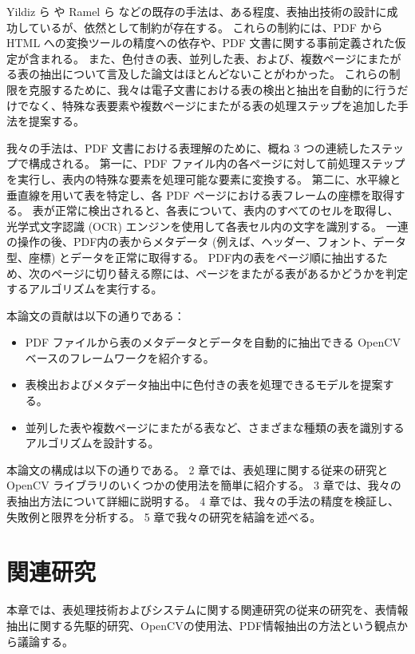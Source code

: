 \documentclass[uplatex, twocolumn,10pt]{jsarticle}
\begin{document}
Yildiz ら \cite{bib01} や Ramel ら \cite{bib02} などの既存の手法は、ある程度、表抽出技術の設計に成功しているが、依然として制約が存在する。
これらの制約には、PDF から HTML への変換ツールの精度への依存や、PDF 文書に関する事前定義された仮定が含まれる。
また、色付きの表、並列した表、および、複数ページにまたがる表の抽出について言及した論文はほとんどないことがわかった。
これらの制限を克服するために、我々は電子文書における表の検出と抽出を自動的に行うだけでなく、特殊な表要素や複数ページにまたがる表の処理ステップを追加した手法を提案する。

我々の手法は、PDF 文書における表理解のために、概ね 3 つの連続したステップで構成される。
第一に、PDF ファイル内の各ページに対して前処理ステップを実行し、表内の特殊な要素を処理可能な要素に変換する。
第二に、水平線と垂直線を用いて表を特定し、各 PDF ページにおける表フレームの座標を取得する。
表が正常に検出されると、各表について、表内のすべてのセルを取得し、光学式文字認識 (OCR) エンジンを使用して各表セル内の文字を識別する。
一連の操作の後、PDF内の表からメタデータ (例えば、ヘッダー、フォント、データ型、座標) とデータを正常に取得する。
PDF内の表をページ順に抽出するため、次のページに切り替える際には、ページをまたがる表があるかどうかを判定するアルゴリズムを実行する。

本論文の貢献は以下の通りである：
\begin{itemize}
    \item PDF ファイルから表のメタデータとデータを自動的に抽出できる OpenCV ベースのフレームワークを紹介する。
    \item 表検出およびメタデータ抽出中に色付きの表を処理できるモデルを提案する。
    \item 並列した表や複数ページにまたがる表など、さまざまな種類の表を識別するアルゴリズムを設計する。
\end{itemize}

本論文の構成は以下の通りである。
2 章では、表処理に関する従来の研究と OpenCV ライブラリのいくつかの使用法を簡単に紹介する。
3 章では、我々の表抽出方法について詳細に説明する。
4 章では、我々の手法の精度を検証し、失敗例と限界を分析する。
5 章で我々の研究を結論を述べる。


\section{関連研究}

本章では、表処理技術およびシステムに関する関連研究の従来の研究を、表情報抽出に関する先駆的研究、OpenCVの使用法、PDF情報抽出の方法という観点から議論する。
\end{document}
